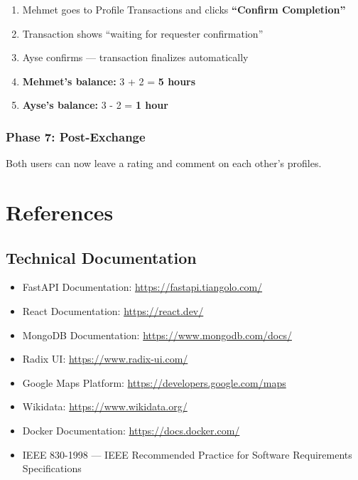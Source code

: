 \documentclass[10pt,a4paper]{report}
\begin{document}
\begin{enumerate}
    \item Mehmet goes to Profile \textrightarrow{} Transactions and clicks \textbf{``Confirm Completion''}
    \item Transaction shows ``waiting for requester confirmation''
    \item Ayse confirms --- transaction finalizes automatically
    \item \textbf{Mehmet's balance:} 3 + 2 = \textbf{5 hours}
    \item \textbf{Ayse's balance:} 3 - 2 = \textbf{1 hour}
\end{enumerate}

\subsection{Phase 7: Post-Exchange}

Both users can now leave a rating and comment on each other's profiles.

\chapter{References}

\section{Technical Documentation}

\begin{itemize}
    \item FastAPI Documentation: \url{https://fastapi.tiangolo.com/}
    \item React Documentation: \url{https://react.dev/}
    \item MongoDB Documentation: \url{https://www.mongodb.com/docs/}
    \item Radix UI: \url{https://www.radix-ui.com/}
    \item Google Maps Platform: \url{https://developers.google.com/maps}
    \item Wikidata: \url{https://www.wikidata.org/}
    \item Docker Documentation: \url{https://docs.docker.com/}
    \item IEEE 830-1998 --- IEEE Recommended Practice for Software Requirements Specifications
\end{itemize}
\end{document}
